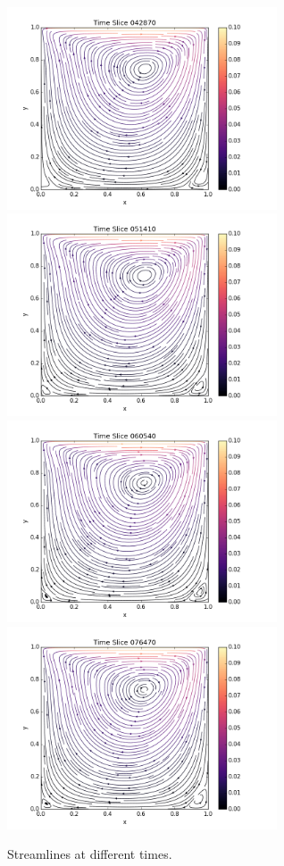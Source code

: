 \documentclass[11pt]{article}
\begin{document}
\begin{center}
\begin{figure}[ht!]
\begin{minipage}{16cm}
\includegraphics[width=8cm]{seq05}\includegraphics[width=8cm]{seq06}
\includegraphics[width=8cm]{seq07}\includegraphics[width=8cm]{seq08}
\end{minipage}
\caption{Streamlines at different times.}
\end{figure}
\end{center}
\end{document}
